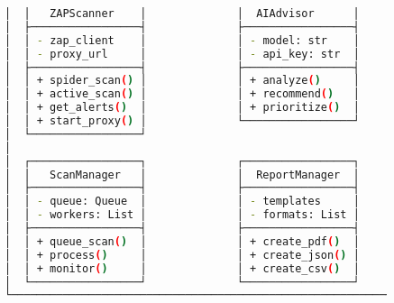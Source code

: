 \documentclass[main.tex]{subfiles}
\begin{document}
\begin{figure}[h]
\begin{lstlisting}[language=bash, caption=WebSecPen Class диаграм]
│  │   ZAPScanner    │              │  AIAdvisor      │           │
│  ├─────────────────┤              ├─────────────────┤           │
│  │ - zap_client    │              │ - model: str    │           │
│  │ - proxy_url     │              │ - api_key: str  │           │
│  ├─────────────────┤              ├─────────────────┤           │
│  │ + spider_scan() │              │ + analyze()     │           │
│  │ + active_scan() │              │ + recommend()   │           │
│  │ + get_alerts()  │              │ + prioritize()  │           │
│  │ + start_proxy() │              └─────────────────┘           │
│  └─────────────────┘                                            │
│                                                                 │
│  ┌─────────────────┐              ┌─────────────────┐           │
│  │   ScanManager   │              │  ReportManager  │           │
│  ├─────────────────┤              ├─────────────────┤           │
│  │ - queue: Queue  │              │ - templates     │           │
│  │ - workers: List │              │ - formats: List │           │
│  ├─────────────────┤              ├─────────────────┤           │
│  │ + queue_scan()  │              │ + create_pdf()  │           │
│  │ + process()     │              │ + create_json() │           │
│  │ + monitor()     │              │ + create_csv()  │           │
│  └─────────────────┘              └─────────────────┘           │
└─────────────────────────────────────────────────────────────────┘
\end{lstlisting}
\end{figure}
\end{document}
